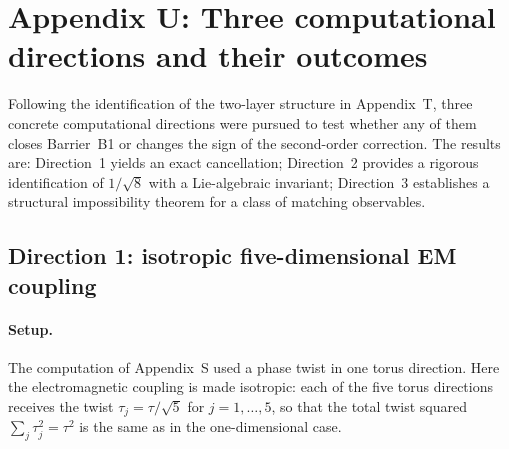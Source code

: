 
\section{Appendix U: Three computational directions and their outcomes}
\label{app:threeDirections}

Following the identification of the two-layer structure in Appendix~T,
three concrete computational directions were pursued to test whether
any of them closes Barrier~B1 or changes the sign of the second-order
correction.  The results are:
Direction~1 yields an exact cancellation;
Direction~2 provides a rigorous identification of $1/\sqrt{8}$ with a
Lie-algebraic invariant;
Direction~3 establishes a structural impossibility theorem for a class
of matching observables.

\subsection{Direction 1: isotropic five-dimensional EM coupling}
\label{ssec:D1}

\paragraph{Setup.}
The computation of Appendix~S used a phase twist in one torus direction.
Here the electromagnetic coupling is made isotropic: each of the five
torus directions receives the twist
$\tau_j = \tau/\sqrt{5}$ for $j=1,\ldots,5$, so that the total twist
squared $\sum_j\tau_j^2 = \tau^2$ is the same as in the one-dimensional
case.

